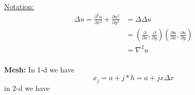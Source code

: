 \documentclass[10pt]{article}
\newcommand{\1}{\mathbb{1}}
\renewcommand{\part}{\partial}
\begin{document}
\underline{Notation:}\\

\begin{align*}
\Delta u = \frac{\part^2 u}{\part x^2} + \frac{\part u^2}{\part y^2} &= \Delta \Delta u\\
&= (\frac{\part}{\part x}, \frac{\part}{\part y}) (\frac{\part u}{\part x}, \frac{\part u}{\part y})\\
&= \nabla^2 u\\
\end{align*}

\textbf{Mesh:} In 1-d we have
\[x_j = a + j*h = a + jx \Delta x\]
in 2-d we have
\end{document}
